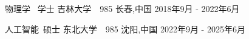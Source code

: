 

\begin{cventries}

  \cventryfour
    {物理学 \ 学士} %
    {吉林大学\ \ 985} %
    {长春,中国} %
    {2018年9月 - 2022年6月} %

  \cventryfour
    {人工智能\ 硕士} %
    {东北大学\ \ 985} %
    {沈阳,中国} %
    {2022年9月 - 2025年6月}

\end{cventries}
